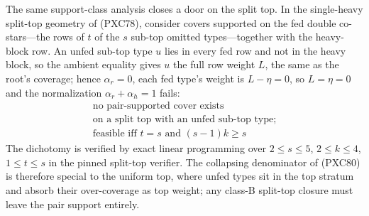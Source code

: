 \documentclass[11pt]{article}
\begin{document}
The same support-class analysis closes a door on the split top.  In the
single-heavy split-top geometry of (PXC78), consider covers supported on
the fed double co-stars---the rows of $t$ of the $s$ sub-top omitted
types---together with the heavy-block row.  An unfed sub-top type $u$
lies in every fed row and not in the heavy block, so the ambient
equality gives $u$ the full row weight $L$, the same as the root's
coverage; hence $\alpha_r=0$, each fed type's weight is $L-\eta=0$,
so $L=\eta=0$ and the normalization $\alpha_r+\alpha_h=1$ fails:
\[
 \begin{gathered}
 \text{no pair-supported cover exists}\\
 \text{on a split top with an unfed sub-top type;}\\
 \text{feasible iff }t=s\text{ and }(s-1)k\ge s
 \end{gathered}                                      \tag{PXC82}
\]
The dichotomy is verified by exact linear programming over
$2\le s\le5$, $2\le k\le4$, $1\le t\le s$ in the pinned split-top
verifier.  The collapsing denominator of (PXC80) is therefore special
to the uniform top, where unfed types sit in the top stratum and absorb
their over-coverage as top weight; any class-B split-top closure must
leave the pair support entirely.
\end{document}
